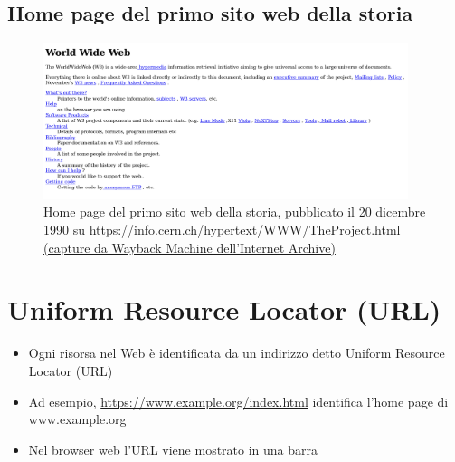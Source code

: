 \documentclass{beamer}
\begin{document}
\subsection*{Home page del primo sito web della storia}
\begin{frame}{\insertsection}{\insertsubsection}
\begin{figure}
\includegraphics[width=0.95\textwidth]{imgs/www-historical-page-screenshot.png}
\caption{Home page del primo sito web della storia, pubblicato il 20 dicembre
1990 su \url{https://info.cern.ch/hypertext/WWW/TheProject.html}
\href{https://web.archive.org/web/20250129055359/https://info.cern.ch/hypertext/WWW/TheProject.html}{(capture da Wayback Machine dell'Internet Archive)}}
\end{figure}
\end{frame}

\section{Uniform Resource Locator (URL)}
\begin{frame}{\insertsection}
\begin{itemize}
\item Ogni risorsa nel Web è identificata da un indirizzo detto
\alert{Uniform Resource Locator (URL)}
\item Ad esempio, \url{https://www.example.org/index.html} identifica
l'\alert{home page} di \alert{www.example.org}
\item Nel \alert{browser web} l'URL viene mostrato in una barra
\end{itemize}
\end{frame}
\end{document}
